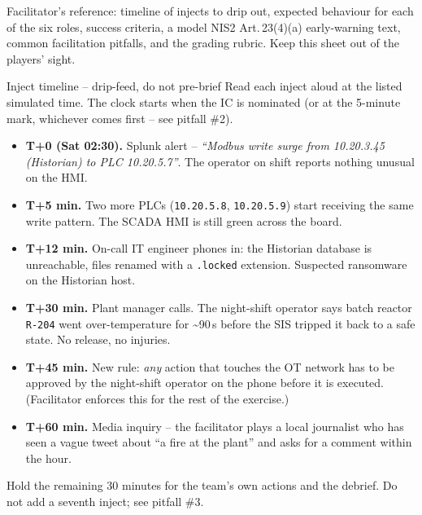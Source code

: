 \documentclass[11pt,a4paper]{article}
\begin{document}
\labheader

\begin{goalbox}
Facilitator's reference: timeline of injects to drip out, expected
behaviour for each of the six roles, success criteria, a model NIS2
Art.\,23(4)(a) early-warning text, common facilitation pitfalls, and
the grading rubric. Keep this sheet out of the players' sight.
\end{goalbox}

\begin{solutionbox}{Inject timeline -- drip-feed, do not pre-brief}
Read each inject aloud at the listed simulated time. The clock starts
when the IC is nominated (or at the 5-minute mark, whichever comes
first -- see pitfall \#2).
\begin{itemize}[leftmargin=*, nosep]
  \item \textbf{T+0 (Sat 02:30).} Splunk alert -- \emph{``Modbus write
        surge from 10.20.3.45 (Historian) to PLC 10.20.5.7''}. The
        operator on shift reports nothing unusual on the HMI.
  \item \textbf{T+5 min.} Two more PLCs (\texttt{10.20.5.8},
        \texttt{10.20.5.9}) start receiving the same write pattern.
        The SCADA HMI is still green across the board.
  \item \textbf{T+12 min.} On-call IT engineer phones in: the Historian
        database is unreachable, files renamed with a \texttt{.locked}
        extension. Suspected ransomware on the Historian host.
  \item \textbf{T+30 min.} Plant manager calls. The night-shift
        operator says batch reactor \texttt{R-204} went over-temperature
        for \textasciitilde{}90\,s before the SIS tripped it back to a
        safe state. No release, no injuries.
  \item \textbf{T+45 min.} New rule: \emph{any} action that touches the
        OT network has to be approved by the night-shift operator on
        the phone before it is executed. (Facilitator enforces this for
        the rest of the exercise.)
  \item \textbf{T+60 min.} Media inquiry -- the facilitator plays a
        local journalist who has seen a vague tweet about ``a fire at
        the plant'' and asks for a comment within the hour.
\end{itemize}
Hold the remaining 30 minutes for the team's own actions and the
debrief. Do not add a seventh inject; see pitfall \#3.
\end{solutionbox}
\end{document}

